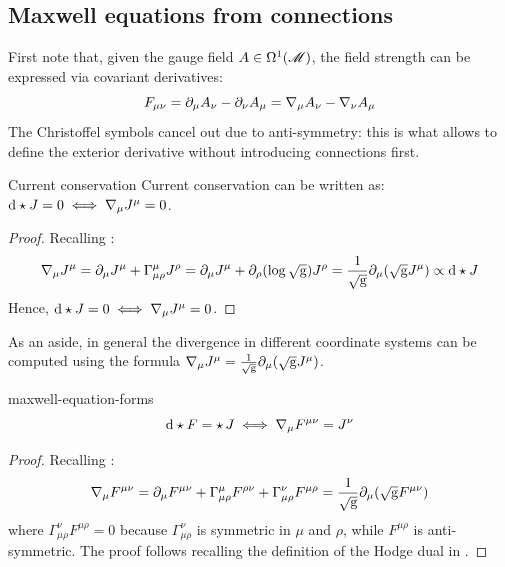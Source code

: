 \subsection{Maxwell equations from connections}

First note that, given the gauge field $ A \in \Omega^{1}(\mathscr{M}) $, the field strength can be expressed via covariant derivatives:
\begin{equation*}
  F_{\mu \nu} = \partial_\mu A_\nu - \partial_\nu A_\mu = \nabla_\mu A_\nu - \nabla_\nu A_\mu
\end{equation*}
The Christoffel symbols cancel out due to anti-symmetry: this is what allows to define the exterior derivative without introducing connections first.

\begin{proposition}{Current conservation}{}
  Current conservation can be written as: $ \mathrm{d} \star J = 0 \iff \nabla_\mu J^\mu = 0 $.
\end{proposition}

\begin{proofbox}
  \begin{proof}
    Recalling :
    \begin{equation*}
      \nabla_\mu J^\mu = \partial_\mu J^\mu + \Gamma^\mu_{\mu \rho} J^\rho = \partial_\mu J^\mu + \partial_\rho (\log \sqrt{\mathrm{g}}) J^\rho = \frac{1}{\sqrt{\mathrm{g}}} \partial_\mu (\sqrt{\mathrm{g}} J^\mu) \propto \mathrm{d} \star J
    \end{equation*}
    Hence, $ \mathrm{d} \star J = 0 \iff \nabla_\mu J^\mu = 0 $.
  \end{proof}
\end{proofbox}

As an aside, in general the divergence in different coordinate systems can be computed using the formula $ \nabla_\mu J^\mu = \frac{1}{\sqrt{\mathrm{g}}} \partial_\mu (\sqrt{\mathrm{g}} J^\mu) $.

\begin{proposition}[before upper = {\tcbtitle}]{}{maxwell-equation-forms}
  \begin{equation}
    \mathrm{d} \star F = \star\, J \iff \nabla_\mu F^{\mu \nu} = J^\nu
  \end{equation}
\end{proposition}

\begin{proofbox}
  \begin{proof}
    Recalling :
    \begin{equation*}
      \nabla_\mu F^{\mu \nu} = \partial_\mu F^{\mu \nu} + \Gamma^\mu_{\mu \rho} F^{\rho \nu} + \Gamma^\nu_{\mu \rho} F^{\mu \rho} = \frac{1}{\sqrt{\mathrm{g}}} \partial_\mu (\sqrt{\mathrm{g}} F^{\mu \nu})
    \end{equation*}
    where $ \Gamma^\nu_{\mu \rho} F^{\mu \rho} = 0 $ because $ \Gamma^\nu_{\mu \rho} $ is symmetric in $ \mu $ and $ \rho $, while $ F^{\mu \rho} $ is anti-symmetric. The proof follows recalling the definition of the Hodge dual in .
  \end{proof}
\end{proofbox}


